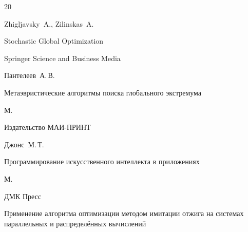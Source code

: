 \begin{thebibliography}{20}





\by Zhigljavsky~A., Zilinskas~A.

\book Stochastic Global Optimization

\publ Springer Science and Business Media







\by Пантелеев~А.\,В.

\book Метаэвристические алгоритмы поиска глобального экстремума

\publaddr М.

\publ Издательство МАИ-ПРИНТ







\by Джонс~М.\,Т.

\book Программирование искусственного интеллекта в приложениях

\publaddr М.

\publ ДМК Пресс







\paper Применение алгоритма оптимизации методом имитации отжига на системах параллельных и распределённых вычислений


\end{thebibliography}
